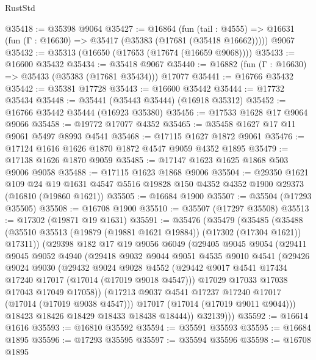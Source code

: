 \begin{lexlean}{RustStd}
\begin{coremodule}
{\begin{coremodule}
{{{{{{{{{{{{{{{{{{{{{{{{{{{{{{{{{{{{{{{{{{{{{{{{{{{{{{{@35418 := @35398 @9064
@35427 := @16864
    (fun (tail : @4555) => @16631 (fun (Γ : @16630) => @35417 (@35383 (@17681 (@35418 @16662)))))
    @9067
@35432 := @35313 (@16650 (@17653 (@17674 (@16659 @9068))))
@35433 := @16600 @35432
@35434 := @35418 @9067
@35440 := @16882 (fun (Γ : @16630) => @35433 (@35383 (@17681 @35434))) @17077
@35441 := @16766 @35432
@35442 := @35381 @17728
@35443 := @16600 @35442
@35444 := @17732 @35434
@35448 := @35441 (@35443 @35444) (@16918 @35312)
@35452 := @16766 @35442 @35444 (@16923 @35380)
@35456 := @17533 @1628 @17 @9064 @9066
@35458 := @19772 @17077 @4352
@35465 := @35458 @1627 @17 @11 @9061 @5497 @8993 @4541
@35468 := @17115 @1627 @1872 @9061
@35476 := @17124 @1616 @1626 @1870 @1872 @4547 @9059 @4352 @1895
@35479 := @17138 @1626 @1870 @9059
@35485 := @17147 @1623 @1625 @1868 @503 @9006 @9058
@35488 := @17115 @1623 @1868 @9006
@35504 := @29350
    @1621
    @109
    @24
    @19
    @1631
    @4547
    @5516
    @19828
    @150
    @4352
    @4352
    @1900
    @29373
    (@16810 (@19860 @1621))
@35505 := @16684 @1900
@35507 := @35504 (@17293 @35505)
@35508 := @16708 @1900
@35510 := @35507 (@17297 @35508)
@35513 := @17302 (@19871 @19 @1631)
@35591 := @35476
    (@35479
      (@35485
        (@35488 (@35510 @35513 (@19879 (@19881 @1621 @19884)) (@17302 (@17304 @1621)) @17311))
        (@29398
          @182
          @17
          @19
          @9056
          @6049
          (@29405
            @9045
            @9054
            (@29411
              @9045
              @9052
              @4940
              (@29418
                @9032
                @9044
                @9051
                @4535
                @9010
                @4541
                (@29426
                  @9024
                  @9030
                  (@29432
                    @9024
                    @9028
                    @4552
                    (@29442 @9017 @4541 @17434 @17240 @17017 (@17014 (@17019 @9018 @4547)))
                    @17029
                    @17033
                    @17038
                    @17043
                    @17049
                    @17058))
                (@17213 @9037 @4541 @17237 @17240 @17017 (@17014 (@17019 @9038 @4547)))
                @17017
                (@17014 (@17019 @9011 @9044)))
              @18423
              @18426
              @18429
              @18433
              @18438
              @18444))
          @32139)))
@35592 := @16614 @1616
@35593 := @16810 @35592
@35594 := @35591 @35593
@35595 := @16684 @1895
@35596 := @17293 @35595
@35597 := @35594 @35596
@35598 := @16708 @1895
}}}}}}}}}}}}}}}}}}}}}}}}}}}}}}}}}}}}}}}}}}}}}}}}}}}}}}}
\end{coremodule}}
\end{coremodule}
\end{lexlean}
